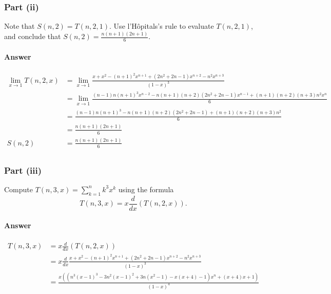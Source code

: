 \subsubsection{Part (ii)}
Note that $ S(n,2) = T(n,2,1) $.
Use l'H\^{o}pitals's rule to evaluate $ T(n,2,1) $, and conclude that $ S(n,2) = \frac{n(n+1)(2n+1)}{6} $.

\paragraph{Answer}
\begin{align*}
    \lim_{x \rightarrow 1} T(n, 2, x) &= \lim_{x \rightarrow 1} \frac{x + x^2 - (n + 1)^2 x^{n + 1} + (2n^2 + 2 n - 1) x^{n + 2} - n^2 x^{n + 3}}{(1 - x)^3} \\
                                      &= \lim_{x \rightarrow 1} \frac{(n - 1) n (n + 1)^3 x^{n - 2} - n(n + 1)(n + 2)(2 n^2 + 2 n - 1) x^{n - 1} + (n + 1)(n + 2)(n + 3) n^2 x^n}{6} \\
                                      &= \frac{(n - 1) n (n + 1)^3 - n(n + 1)(n + 2)(2 n^2 + 2 n - 1) + (n + 1)(n + 2)(n + 3) n^2}{6} \\
                                      &= \frac{n (n + 1) (2 n + 1)}{6} \\
    S(n, 2) &= \frac{n (n + 1) (2 n + 1)}{6} \\
\end{align*}

\subsubsection{Part (iii)}
Compute $ T(n,3,x) = \sum_{k=1}^{n} k^3 x^k $ using the formula
\begin{equation*}
    T(n, 3, x) = x \frac{d}{dx} (T(n, 2, x)).
\end{equation*}

\paragraph{Answer}
\begin{align*}
    T(n, 3, x) &= x \frac{d}{dx} (T(n, 2, x)) \\
               &= x \frac{d}{dx} \frac{x + x^2 - (n + 1)^2 x^{n + 1} + (2 n^2 + 2 n - 1) x^{n + 2} - n^2 x^{n + 3}}{(1 - x)^3}\\
               &= \frac{x((n^3 (x - 1)^3 - 3 n^2 (x - 1)^2 + 3 n (x^2 - 1) - x (x + 4) - 1) x^n + (x + 4) x + 1)}{(1 - x)^4}
\end{align*}


